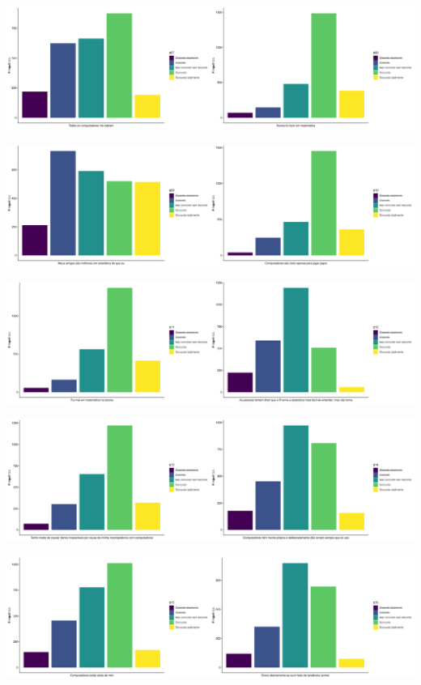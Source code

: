 \documentclass[
  letterpaper,
  DIV=11,
  numbers=noendperiod]{scrartcl}
\begin{document}
\includegraphics{descritiva_files/figure-pdf/unnamed-chunk-26-4.pdf}

\includegraphics{descritiva_files/figure-pdf/unnamed-chunk-26-5.pdf}

\includegraphics{descritiva_files/figure-pdf/unnamed-chunk-26-6.pdf}

\includegraphics{descritiva_files/figure-pdf/unnamed-chunk-26-7.pdf}

\includegraphics{descritiva_files/figure-pdf/unnamed-chunk-26-8.pdf}
\end{document}
